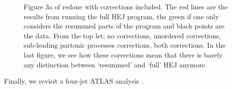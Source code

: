 \begin{figure}[t]
\caption{Figure 3a of \cite{Aad2014} redone with corrections included. The red lines are the results from running the full HEJ program, the green if one only considers the resummed parts of the program and black points are the data. From the top let; no corrections, unordered corrections, sub-leading partonic processes corrections, both corrections. In the last figure, we see how these corrections mean that there is barely any distinction between `resummed' and `full' HEJ anymore.}
\label{fig:newveto3a}
\end{figure}

Finally, we revisit a four-jet ATLAS analysis \cite{Aad2015}. 

